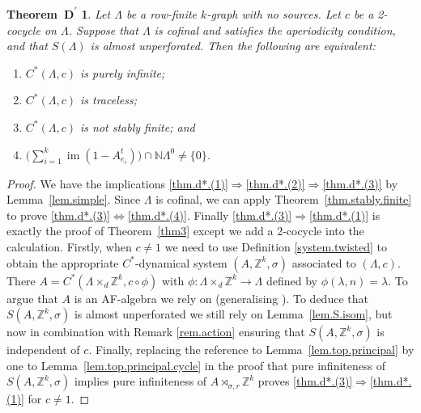 \documentclass[a4paper, 12pt]{amsart}
\numberwithin{equation}{section}
\newcounter{theorem}
\newtheorem*{thmd*}{Theorem~D\textsuperscript{$\prime$}}
\theoremstyle{remark}
\theoremstyle{definition}
\begin{document}
\begin{thmd*}\label{thm.d*}
Let $\Lambda$ be a row-finite $k$-graph with no sources. Let $c$ be a 2-cocycle on
$\Lambda$. Suppose that $\Lambda$ is cofinal and satisfies the aperiodicity condition,
and that $S(\Lambda)$ is almost unperforated. Then the following are equivalent:
\begin{enumerate}
\item\label{thm.d*.(1)} $C^*(\Lambda,c)$ is purely infinite;
\item\label{thm.d*.(2)} $C^*(\Lambda,c)$ is traceless;
\item\label{thm.d*.(3)} $C^*(\Lambda,c)$ is not stably finite; and
\item\label{thm.d*.(4)} $\big(\sum_{i=1}^k{\operatorname{im}}(1-A^t_{e_i}) \big) \cap {\mathbb{N}}\Lambda^0\neq \{0\}$.
\end{enumerate}
\end{thmd*}
\begin{proof}
We have the implications \eqref{thm.d*.(1)}$\Rightarrow$\eqref{thm.d*.(2)}$\Rightarrow$\eqref{thm.d*.(3)} by Lemma~\ref{lem.simple}.
Since $\Lambda$ is cofinal, we can apply Theorem~\ref{thm.stably.finite} to prove \eqref{thm.d*.(3)}$\Leftrightarrow$\eqref{thm.d*.(4)}.
Finally \eqref{thm.d*.(3)}$\Rightarrow$\eqref{thm.d*.(1)} is exactly the proof of Theorem~\ref{thm3} except we add a
2-cocycle into the calculation. Firstly, when $c\neq 1$ we need to use Definition
\ref{system.twisted} to obtain the appropriate $C^*$-dynamical system $(A,{\mathbb{Z}}^k,\sigma)$
associated to $(\Lambda, c)$. There $A=C^*(\Lambda\times_d {\mathbb{Z}}^k,c\circ \phi)$ with
$\phi\colon \Lambda\times_d {\mathbb{Z}}^k \to \Lambda$ defined by $\phi(\lambda, n) = \lambda$.
To argue that $A$ is an AF-algebra we rely on \cite[Lemma~8.4]{MR3335414} (generalising
\cite{MR1745529}). To deduce that $S(A,{\mathbb{Z}}^k,\sigma)$ is almost unperforated we still
rely on Lemma~\ref{lem.S.isom}, but now in combination with Remark \ref{rem.action}
ensuring that $S(A,{\mathbb{Z}}^k,\sigma)$ is independent of $c$. Finally, replacing the reference to Lemma~\ref{lem.top.principal} by one to Lemma~\ref{lem.top.principal.cycle} in the proof that
pure infiniteness of $S(A,{\mathbb{Z}}^k,\sigma)$ implies pure infiniteness of $A\rtimes_{\sigma,r} {\mathbb{Z}}^k$
proves \eqref{thm.d*.(3)}$\Rightarrow$\eqref{thm.d*.(1)} for $c\neq
1$.
\end{proof}
\end{document}
